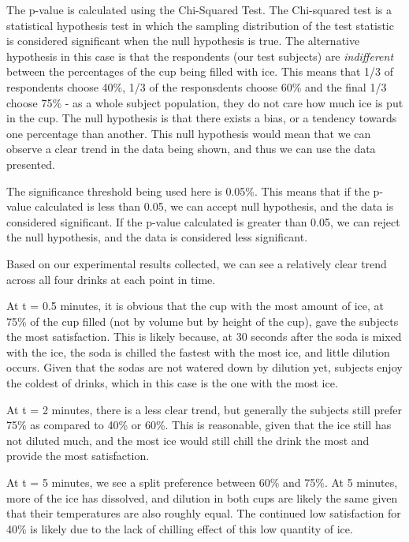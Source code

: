 \documentclass[oneside,12pt]{report}
\begin{document}
The p-value is calculated using the Chi-Squared Test. The Chi-squared test is a statistical hypothesis test in which the sampling distribution of the test statistic is considered significant when the null hypothesis is true. The alternative hypothesis in this case is that the respondents (our test subjects) are \emph{indifferent} between the percentages of the cup being filled with ice. This means that 1/3 of respondents choose 40\%, 1/3 of the responsdents choose 60\% and the final 1/3 choose 75\% - as a whole subject population, they do not care how much ice is put in the cup. The null hypothesis is that there exists a bias, or a tendency towards one percentage than another. This null hypothesis would mean that we can observe a clear trend in the data being shown, and thus we can use the data presented. 

\vspace{6pt}
The significance threshold being used here is 0.05\%. This means that if the p-value calculated is less than 0.05, we can accept null hypothesis, and the data is considered significant. If the p-value calculated is greater than 0.05, we can reject the null hypothesis, and the data is considered less significant. 

\vspace{6pt}
Based on our experimental results collected, we can see a relatively clear trend across all four drinks at each point in time. 

\vspace{6pt}
At t = 0.5 minutes, it is obvious that the cup with the most amount of ice, at 75\% of the cup filled (not by volume but by height of the cup), gave the subjects the most satisfaction. This is likely because, at 30 seconds after the soda is mixed with the ice, the soda is chilled the fastest with the most ice, and little dilution occurs. Given that the sodas are not watered down by dilution yet, subjects enjoy the coldest of drinks, which in this case is the one with the most ice. 

\vspace{6pt}
At t = 2 minutes, there is a less clear trend, but generally the subjects still prefer 75\% as compared to 40\% or 60\%. This is reasonable, given that the ice still has not diluted much, and the most ice would still chill the drink the most and provide the most satisfaction. 

\vspace{6pt}
At t = 5 minutes, we see a split preference between 60\% and 75\%. At 5 minutes, more of the ice has dissolved, and dilution in both cups are likely the same given that their temperatures are also roughly equal. The continued low satisfaction for 40\% is likely due to the lack of chilling effect of this low quantity of ice.
\end{document}
